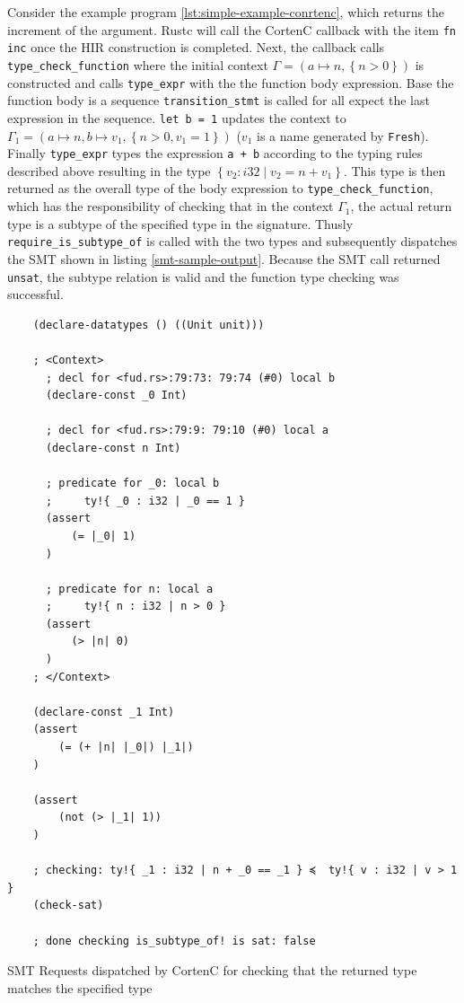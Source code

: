 \documentclass{book}
\newcommand{\code}[1]{\texttt{#1}}
\theoremstyle{definition}
\begin{document}
Consider the example program \ref{lst:simple-example-conrtenc}, which returns the increment of the argument.
Rustc will call the CortenC callback with the item \code{fn inc} once the HIR construction is completed. Next, the callback calls \code{type\_check\_function} where the initial context $\Gamma = ( a \mapsto n, \left\{ n > 0\right\})$ is constructed and calls \code{type\_expr} with the the function body expression. Base the function body is a sequence \code{transition\_stmt} is called for all expect the last expression in the sequence. \code{let b = 1} updates the context to $\Gamma_1 = ( a \mapsto n, b \mapsto v_1, \left\{ n > 0, v_1 = 1\right\})$ ($v_1$ is a name generated by \code{Fresh}). 
Finally \code{type\_expr} types the expression \code{a + b} according to the typing rules described above resulting in the type $\left\{ v_2 : i32 \mid v_2 = n + v_1\right\}$.
This type is then returned as the overall type of the body expression to \code{type\_check\_function}, which has the responsibility of checking that in the context $\Gamma_1$, the actual return type is a subtype of the specified type in the signature. 
Thusly \code{require\_is\_subtype\_of} is called with the two types and subsequently dispatches the SMT shown in listing \ref{smt-sample-output}. 
Because the SMT call returned \code{unsat}, the subtype relation is valid and the function type checking was successful.


\begin{listing}[h]
  \begin{verbatim}
    (declare-datatypes () ((Unit unit)))

    ; <Context>
      ; decl for <fud.rs>:79:73: 79:74 (#0) local b
      (declare-const _0 Int)
      
      ; decl for <fud.rs>:79:9: 79:10 (#0) local a
      (declare-const n Int)
      
      ; predicate for _0: local b
      ;     ty!{ _0 : i32 | _0 == 1 }
      (assert
          (= |_0| 1)
      )
      
      ; predicate for n: local a
      ;     ty!{ n : i32 | n > 0 }
      (assert
          (> |n| 0)
      )
    ; </Context>

    (declare-const _1 Int)
    (assert
        (= (+ |n| |_0|) |_1|)
    )
    
    (assert
        (not (> |_1| 1))
    )
    
    ; checking: ty!{ _1 : i32 | n + _0 == _1 } ≼  ty!{ v : i32 | v > 1 }
    (check-sat)
    
    ; done checking is_subtype_of! is sat: false
  \end{verbatim}
  \caption{SMT Requests dispatched by CortenC for checking that the returned type matches the specified type}
  \label{lst:smt-sample-output}
\end{listing}
\end{document}
